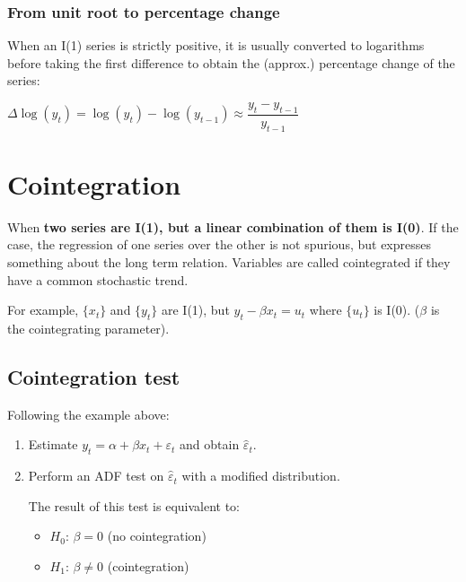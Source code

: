 \documentclass[10pt, a4paper, landscape]{article}
\begin{document}
\begin{multicols}{3}
		\subsubsection*{From unit root to percentage change}
		
		When an I(1) series is strictly positive, it is usually converted to logarithms before taking the first difference to obtain the (approx.) percentage change of the series:
		
		\begin{center}
			$\Delta \log(y_{t}) = \log(y_{t}) - \log(y_{t - 1}) \approx \dfrac{y_t - y_{t - 1}} {y_{t - 1}}$
		\end{center}
		
		\section*{Cointegration}
		
		When \textbf{two series are I(1), but a linear combination of them is I(0)}. If the case, the regression of one series over the other is not spurious, but expresses something about the long term relation. Variables are called cointegrated if they have a common stochastic trend.
		
		For example, $\lbrace x_{t} \rbrace$ and $\lbrace y_{t} \rbrace$ are I(1), but $y_{t} - \beta x_{t} = u_{t}$ where $\lbrace u_{t} \rbrace$ is I(0). ($\beta$ is the cointegrating parameter).

		\subsection*{Cointegration test}
		
		Following the example above:
		
		\begin{enumerate}[leftmargin=*]
			\item Estimate $y_{t} = \alpha + \beta x_{t} + \varepsilon_{t}$ and obtain $\hat{\varepsilon}_{t}$.
			\item Perform an ADF test on $\hat{\varepsilon}_{t}$ with a modified distribution.
			
			The result of this test is equivalent to:
			
			\begin{itemize}[leftmargin=*]
				\item $H_{0}$: $\beta = 0$ (no cointegration)
				\item $H_{1}$: $\beta \neq 0$ (cointegration)
			\end{itemize}
			

\end{enumerate}
\end{multicols}
\end{document}
